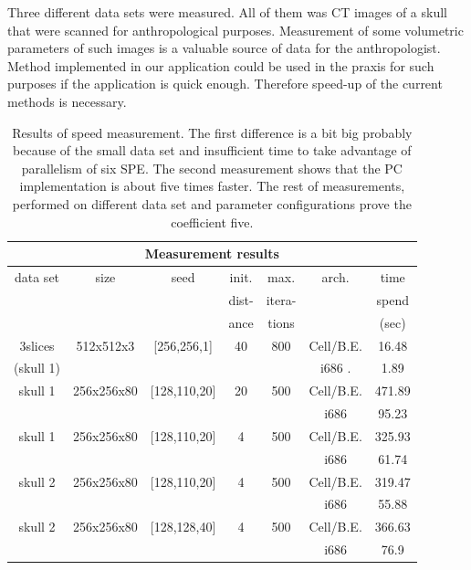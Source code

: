 \par
Three different data sets were measured.
All of them was CT images of a skull that were scanned for anthropological purposes.
Measurement of some volumetric parameters of such images is a valuable source of data for the anthropologist.
Method implemented in our application could be used in the praxis for such purposes if the application is quick enough.
Therefore speed-up of the current methods is necessary.

\begin{table}
\centering
\begin{tabular}{|c|c|c|c|c|c|c|}
\hline
\multicolumn{7}{|c|}{Measurement results}\\
\hline
data set		&size		&seed		&init.		&max. 		&arch.		&time\\
			&		&		&dist-		&itera-		&		&spend\\
			&		&		&ance		&tions		&		&(sec)\\
\hline
\hline
3slices 		&512x512x3	&[256,256,1]	&40		&800		&\mbox{Cell/B.E.}	&16.48\\
(skull 1)		&		&		&		&		&i686	.	&1.89\\
\hline
\hline
skull 1			&256x256x80	&[128,110,20]	&20		&500		&\mbox{Cell/B.E.}	&471.89\\
			&		&		&		&		&i686		&95.23\\
\hline
\hline
skull 1			&256x256x80	&[128,110,20]	&4		&500		&\mbox{Cell/B.E.}	&325.93\\
			&		&		&		&		&i686		&61.74\\
\hline
\hline
skull 2			&256x256x80	&[128,110,20]	&4		&500		&\mbox{Cell/B.E.}	&319.47\\
			&		&		&		&		&i686		&55.88\\
\hline
\hline
skull 2			&256x256x80	&[128,128,40]	&4		&500		&\mbox{Cell/B.E.}	&366.63\\
			&		&		&		&		&i686		&76.9\\
\hline
\end{tabular}
\par
\caption[Measurement results]
{
Results of speed measurement.
The first difference is a bit big probably because of the small data set and insufficient time to take advantage of parallelism of six SPE.
The second measurement shows that the PC implementation is about five times faster.
The rest of measurements, performed on different data set and parameter configurations prove the coefficient five.
}
\label{tab:runresults}
\end{table}

